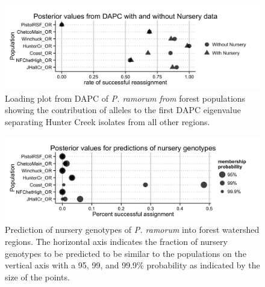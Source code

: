 \documentclass[double,12pt]{beavtex}
\begin{document}
  \begin{figure}
  
  {\centering \includegraphics[width=0.8\linewidth]{figure/phytopathology/figureS5} 
  
  }
  
  \caption[Loading plot from DAPC of \emph{P. ramorum from} forest populations
  showing the contribution of alleles to the first DAPC eigenvalue
  separating Hunter Creek isolates from all other regions.]{Loading plot from DAPC of \emph{P. ramorum from} forest populations
  showing the contribution of alleles to the first DAPC eigenvalue
  separating Hunter Creek isolates from all other regions.}\label{fig:ramS5}
  \end{figure}
  
  \begin{figure}
  
  {\centering \includegraphics[width=0.8\linewidth]{figure/phytopathology/figureS6} 
  
  }
  
  \caption[Prediction of nursery genotypes of \emph{P. ramorum} into forest
  watershed regions.]{Prediction of nursery genotypes of \emph{P. ramorum} into forest
  watershed regions. The horizontal axis indicates the fraction of nursery
  genotypes to be predicted to be similar to the populations on the
  vertical axis with a 95, 99, and 99.9\% probability as indicated by the
  size of the points.}\label{fig:ramS6}
  \end{figure}
  
\end{document}
